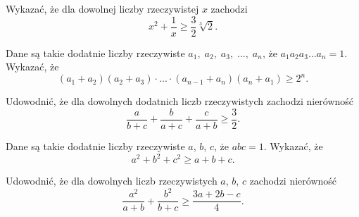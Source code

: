 \begin{problem}{1} 
	Wykazać, że dla dowolnej liczby rzeczywistej $x$ zachodzi
	\[
		x^2 + \frac{1}{x} \geqslant \frac{3}{2}\sqrt[3]{2}.
	\]
\end{problem}

\begin{problem}{2} 
	Dane są takie dodatnie liczby rzeczywiste $a_1, \;a_2,\; a_3,\; ...,\; a_n$, że $a_1a_2a_3...a_n = 1$. Wykazać, że
	\[
		(a_1 + a_2)(a_2 + a_3)\cdot ... \cdot (a_{n-1} + a_n)(a_n + a_1) \geqslant 2^n.
	\]
\end{problem}

\begin{problem}{3} 
	Udowodnić, że dla dowolnych dodatnich liczb rzeczywistych zachodzi nierówność
	\[
		\frac{a}{b + c} + \frac{b}{a + c} + \frac{c}{a + b} \geqslant \frac{3}{2}.
	\]
\end{problem}

\begin{problem}{4} 
	Dane są takie dodatnie liczby rzeczywiste $a$, $b$, $c$, że $abc = 1$. Wykazać, że
	\[
		a^2 + b^2 + c^2 \geqslant a + b + c.
	\]
\end{problem}

\begin{problem}{5} 
	Udowodnić, że dla dowolnych liczb rzeczywistych $a$, $b$, $c$ zachodzi nierówność
	\[
		\frac{a^2}{a + b} + \frac{b^2}{b + c} \geqslant \frac{3a + 2b - c}{4}. 
	\]
\end{problem}